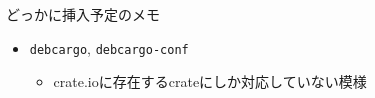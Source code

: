 \documentclass[cjk,dvipdfmx,10pt,compress,t,fragile%
hyperref={bookmarks=true,bookmarksnumbered=true,bookmarksopen=false,%
colorlinks=false,%
pdftitle={第 134 回 関西 Debian 勉強会},%
pdfauthor={小林},%
pdfsubject={資料},%
}]{beamer}
\begin{document}
\begin{frame}[fragile]{どっかに挿入予定のメモ}
 \begin{itemize}
  \item \texttt{debcargo}, \texttt{debcargo-conf}
	\begin{itemize}
	 \item crate.ioに存在するcrateにしか対応していない模様
	\end{itemize}
 \end{itemize}
\end{frame}
\end{document}
